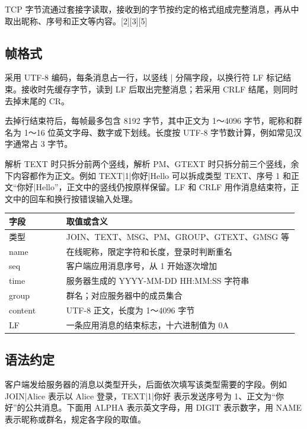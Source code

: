 \documentclass[UTF8,a4paper,10pt,fontset=fandol]{ctexart}
\begin{document}
TCP 字节流通过套接字读取，接收到的字节按约定的格式组成完整消息，再从中取出昵称、序号和正文等内容。[2][3][5]

\subsection{帧格式}
采用 UTF-8 编码，每条消息占一行，以竖线 |\allowbreak{} 分隔字段，以换行符 LF 标记结束。接收时先缓存字节，读到 LF 后取出完整消息；若采用 CRLF 结尾，则同时去掉末尾的 CR。

去掉行结束符后，每帧最多包含 8192 字节，其中正文为 1～4096 字节，昵称和群名为 1～16 位英文字母、数字或下划线。长度按 UTF-8 字节数计算，例如常见汉字通常占 3 字节。

解析 TEXT 时只拆分前两个竖线，解析 PM、GTEXT 时只拆分前三个竖线，余下内容都作为正文。例如 TEXT|\allowbreak{}1|\allowbreak{}你好|\allowbreak{}Hello 可以拆成类型 TEXT、序号 1 和正文“你好|\allowbreak{}Hello”，正文中的竖线仍按原样保留。LF 和 CRLF 用作消息结束符，正文中的回车和换行按错误输入处理。

\medskip
\par\medskip\noindent\begin{minipage}{\linewidth}\centering
\begin{tabular}{@{}>{\raggedright\arraybackslash}p{0.193\linewidth}>{\raggedright\arraybackslash}p{0.772\linewidth}@{}}
\toprule
字段 & 取值或含义\\
\midrule
类型 & JOIN、TEXT、MSG、PM、GROUP、GTEXT、GMSG 等\\
name & 在线昵称，限定字符和长度，登录时判断重名\\
seq & 客户端应用消息序号，从 1 开始逐次增加\\
time & 服务器生成的 YYYY-MM-DD HH:MM:SS 字符串\\
group & 群名；对应服务器中的成员集合\\
content & UTF-8 正文，长度为 1～4096 字节\\
LF & 一条应用消息的结束标志，十六进制值为 0A\\
\bottomrule
\end{tabular}
\end{minipage}\par\medskip
\subsection{语法约定}
客户端发给服务器的消息以类型开头，后面依次填写该类型需要的字段。例如 JOIN|\allowbreak{}Alice 表示以 Alice 登录，TEXT|\allowbreak{}1|\allowbreak{}你好 表示发送序号为 1、正文为“你好”的公共消息。下面用 ALPHA 表示英文字母，用 DIGIT 表示数字，用 NAME 表示昵称或群名，规定各字段的取值。
\end{document}
